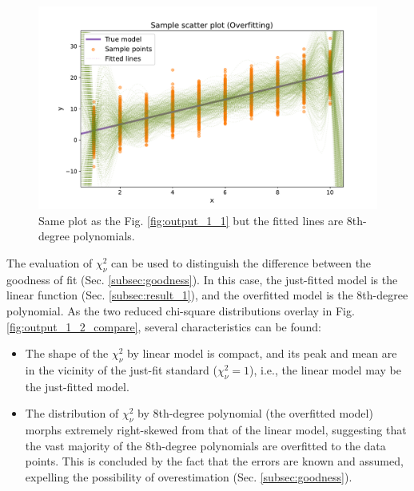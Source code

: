 \documentclass[12pt,a4paper]{article}
\begin{document}
\begin{CJK}{UTF8}{bkai}
\begin{itemize}
    \begin{figure}[h]
        \centering
        \includegraphics[width=1\linewidth]{figures/output/practice_1/output1_1_overfit.pdf}
        \caption{Same plot as the Fig. \ref{fig:output_1_1} but the fitted lines are 8th-degree polynomials.}
        \label{fig:output_1_1_overfit}
    \end{figure}
    The evaluation of $\chi^2_\nu$ can be used to distinguish the difference between the goodness of fit (Sec. \ref{subsec:goodness}). In this case, the just-fitted model is the linear function (Sec. \ref{subsec:result_1}), and the overfitted model is the 8th-degree polynomial. As the two reduced chi-square distributions overlay in Fig. \ref{fig:output_1_2_compare}, several characteristics can be found:
    \begin{itemize}
        \item The shape of the $\chi^2_\nu$ by linear model is compact, and its peak and mean are in the vicinity of the just-fit standard ($\chi^2_\nu=1$), i.e., the linear model may be the just-fitted model.
        \item The distribution of $\chi^2_\nu$ by 8th-degree polynomial (the overfitted model) morphs extremely right-skewed from that of the linear model, suggesting that the vast majority of the 8th-degree polynomials are overfitted to the data points. This is concluded by the fact that the errors are known and assumed, expelling the possibility of overestimation (Sec. \ref{subsec:goodness}).

\end{itemize}
\end{itemize}
\end{CJK}
\end{document}
